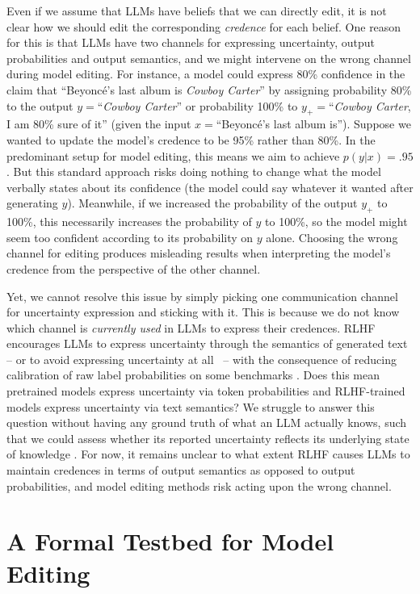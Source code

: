 \documentclass[11pt,a4paper]{article}
\newcommand{\beyonce}{Beyonc\'{e}\xspace}
\begin{document}
Even if we assume that LLMs have beliefs that we can directly edit, it is not clear how we should edit the corresponding \emph{credence} for each belief. One reason for this is that LLMs have two channels for expressing uncertainty, output probabilities and output semantics, and we might intervene on the wrong channel during model editing. For instance, a model could express 80\% confidence in the claim that ``\beyonce's last album is \emph{Cowboy Carter}'' by assigning probability 80\% to the output $y{=}$``\emph{Cowboy Carter}'' or probability 100\% to $y_+{=}$``\emph{Cowboy Carter}, I am 80\% sure of it'' (given the input $x{=}$``\beyonce's last album is''). Suppose we wanted to update the model's credence to be 95\% rather than 80\%. In the predominant setup for model editing, this means we aim to achieve $p(y|x)=.95$. But this standard approach risks doing nothing to change what the model verbally states about its confidence (the model could say whatever it wanted after generating $y$). Meanwhile, if we increased the probability of the output $y_+$ to 100\%, this necessarily increases the probability of $y$ to 100\%, so the model might seem too confident according to its probability on $y$ alone. Choosing the wrong channel for editing produces misleading results when interpreting the model's credence from the perspective of the other channel. 

Yet, we cannot resolve this issue by simply picking one communication channel for uncertainty expression and sticking with it. This is because we do not know which channel is \emph{currently used} in LLMs to express their credences. RLHF encourages LLMs to express uncertainty through the semantics of generated text -- or to avoid expressing uncertainty at all \citep{zhou2024relying}~-- with the consequence of reducing calibration of raw label probabilities on some benchmarks \citep{achiam2023gpt}. 
Does this mean pretrained models express uncertainty via token probabilities and RLHF-trained models express uncertainty via text semantics? We struggle to answer this question without having any ground truth of what an LLM actually knows, such that we could assess whether its reported uncertainty reflects its underlying state of knowledge \citep{jiang2020can, farquhar2023challenges}. For now, it remains unclear to what extent RLHF causes LLMs to maintain credences in terms of output semantics as opposed to output probabilities, and model editing methods risk acting upon the wrong channel. 

\section{A Formal Testbed for Model Editing}
\label{sec:testbed}
\end{document}
